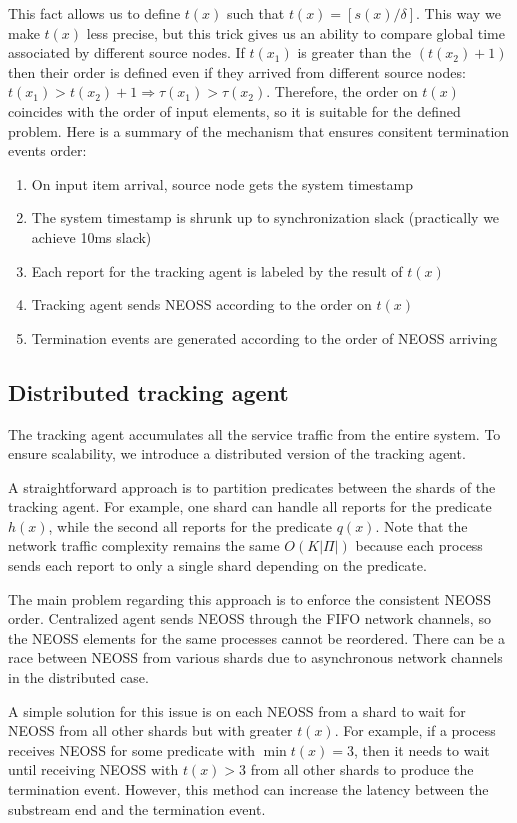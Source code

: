 This fact allows us to define $t(x)$ such that $t(x) = [s(x) / \delta]$. This way we make $t(x)$ less precise, but this trick gives us an ability to compare global time associated by different source nodes. If $t(x_1)$ is greater than the $(t(x_2) + 1)$ then their order is defined even if they arrived from different source nodes:  $t(x_1) > t(x_2) + 1 \Rightarrow \tau(x_1) > \tau(x_2)$. Therefore, the order on $t(x)$ coincides with the order of input elements, so it is suitable for the defined problem. Here is a summary of the mechanism that ensures consitent termination events order:
\begin{enumerate}
    \item On input item arrival, source node gets the system timestamp
    \item The system timestamp is shrunk up to synchronization slack (practically we achieve 10ms slack)
    \item Each report for the tracking agent is labeled by the result of $t(x)$
    \item Tracking agent sends NEOSS according to the order on $t(x)$
    \item Termination events are generated according to the order of NEOSS arriving
\end{enumerate}

\subsection{Distributed tracking agent}

The tracking agent accumulates all the service traffic from the entire system. To ensure scalability, we introduce a distributed version of the tracking agent.

A straightforward approach is to partition predicates between the shards of the tracking agent. For example, one shard can handle all reports for the predicate $h(x)$, while the second all reports for the predicate $q(x)$. Note that the network traffic complexity remains the same $O(K|\Pi|)$ because each process sends each report to only a single shard depending on the predicate.

The main problem regarding this approach is to enforce the consistent NEOSS order. Centralized agent sends NEOSS through the FIFO network channels, so the NEOSS elements for the same processes cannot be reordered. There can be a race between NEOSS from various shards due to asynchronous network channels in the distributed case.

A simple solution for this issue is on each NEOSS from a shard to wait for NEOSS from all other shards but with greater $t(x)$. For example, if a process receives NEOSS for some predicate with $\min t(x) = 3$, then it needs to wait until receiving NEOSS with $t(x) > 3$ from all other shards to produce the termination event. However, this method can increase the latency between the substream end and the termination event.

